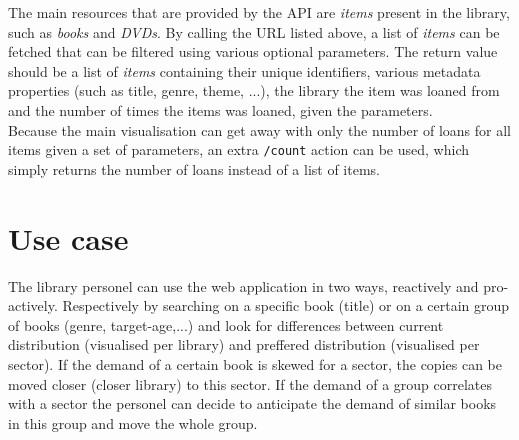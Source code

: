 The main resources that are provided by the API are \emph{items} present in the library, such as \emph{books} and \emph{DVDs}.
By calling the URL listed above, a list of \emph{items} can be fetched that can be filtered using various optional parameters.
The return value should be a list of \emph{items} containing their unique identifiers, various metadata properties (such as title, genre, theme, ...), the library the item was loaned from and the number of times the items was loaned, given the parameters.\\

Because the main visualisation can get away with only the number of loans for all items given a set of parameters, an extra \texttt{/count} action can be used, which simply returns the number of loans instead of a list of items.

\section{Use case}

The library personel can use the web application in two ways, reactively and pro-actively. Respectively by searching on a specific book (title) or on a certain group of books (genre, target-age,...) and look for differences between current distribution (visualised per library) and preffered distribution (visualised per sector). If the demand of a certain book is skewed for a sector, the copies can be moved closer (closer library) to this sector. If the demand of a group correlates with a sector the personel can decide to anticipate the demand of similar books in this group and move the whole group.
